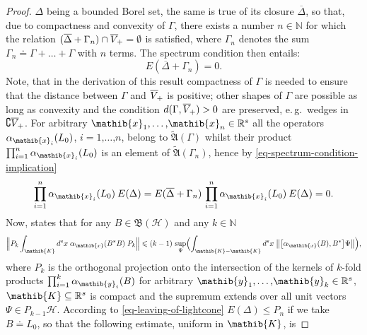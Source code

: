 \documentclass[11pt,twoside,openright]{report}
\theoremstyle{definition}
\theoremstyle{plain}
\theoremstyle{remark}
\theoremstyle{assumption}
\newcommand{\bcomm}[2]{\bigl[ #1 , #2 \bigr]}
\newcommand{\bnorm}[1]{\bigl\lVert #1 \bigr\rVert}
\newcommand{\Bnorm}[1]{\Bigl\lVert #1 \Bigr\rVert}
\newcommand{\Nbb}{\mathbb{N}}
\newcommand{\Afrak}{\mathfrak{A}}
\newcommand{\Kib}{\mathib{K}}
\newcommand{\xib}{\mathib{x}}
\newcommand{\yib}{\mathib{y}}
\newcommand{\Hscr}{\mathscr{H}}
\newcommand{\Rs}{\mathbb{R}^s}
\newcommand{\BH}{\mathfrak{B} ( \mathscr{H} )}
\newcommand{\fwcone}{\overline{V}_{\negthinspace +}}
\newcommand{\ED}{E ( \Delta )}
\newcommand{\aibx}{\alpha_\mathib{x}}
\begin{document}
\begin{proof}
  $\Delta$ being a bounded Borel set, the same is true of its closure
  $\overline{\Delta}$, so that, due to compactness and convexity of
  $\Gamma$, there exists a number $n \in \Nbb$ for which the relation
  \label{page-proof-harmonic-analysis} $( \overline{\Delta} + \Gamma_n
  ) \cap \fwcone = \emptyset$ is satisfied, where $\Gamma_n$ denotes
  the sum $\Gamma_n \doteq \Gamma + \dots + \Gamma$ with $n$
  terms. The spectrum condition then entails:
  \begin{equation}
    \label{eq-spectrum-condition-implication}
    E ( \overline{\Delta} + \Gamma_n ) = 0 \text{.}
  \end{equation}
  Note, that in the derivation of this result compactness of $\Gamma$
  is needed to ensure that the distance between $\Gamma$ and $\fwcone$
  is positive; other shapes of $\Gamma$ are possible as long as
  convexity and the condition $d ( \Gamma , \fwcone ) > 0$ are
  preserved, e.\,g.~wedges in $\complement \fwcone$. For arbitrary
  $\xib_1 \text{,} \dots \text{,} \xib_n \in \Rs$ all the operators
  $\alpha_{\xib_i} ( L_0 )$, $i = 1 \text{,} \dots \text{,} n$, belong
  to $\widetilde{\Afrak} ( \Gamma )$ whilst their product
  $\prod_{i = 1}^n \alpha_{\xib_i} ( L_0 )$ is an element of
  $\widetilde{\Afrak} ( \Gamma_n )$, hence by
  \eqref{eq-spectrum-condition-implication}
  \begin{equation}
    \label{eq-leaving-of-lightcone}
    \prod_{i = 1}^n \alpha_{\xib_i} ( L_0 ) \: \ED = E (
    \overline{\Delta} + \Gamma_n ) \, \prod_{i = 1}^n \alpha_{\xib_i}
    ( L_0 ) \: \ED = 0 \text{.}
  \end{equation}
  Now, \cite[Lemma~2.2]{buchholz:1990} states that for any $B \in \BH$
  and any $k \in \Nbb$
  \begin{equation}
    \label{eq-harmonic-analysis-integral}
    \Bnorm{P_k \int_\Kib d^s x \; \aibx ( B^* B ) \; P_k} \leqslant (
    k - 1 ) \, \sup_\Psi \Bigl( \int_{\Kib - \Kib} d^s x \;
    \bnorm{\bcomm{\aibx ( B )}{B^*} \Psi} \Bigr) \text{,} 
  \end{equation}
  where $P_k$ is the orthogonal projection onto the intersection of
  the kernels of $k$-fold products $\prod_{i = 1}^k \alpha_{\yib_i} (
  B )$ for arbitrary $\yib_1 \text{,} \dots \text{,} \yib_k \in \Rs$,
  $\Kib \subseteq \Rs$ is compact and the supremum extends over all
  unit vectors $\Psi \in P_{k - 1} \Hscr$. According to
  \eqref{eq-leaving-of-lightcone} $\ED \leqslant P_n$ if we take $B
  \doteq L_0$, so  that the following  estimate, uniform in $\Kib$, is

\end{proof}
\end{document}

